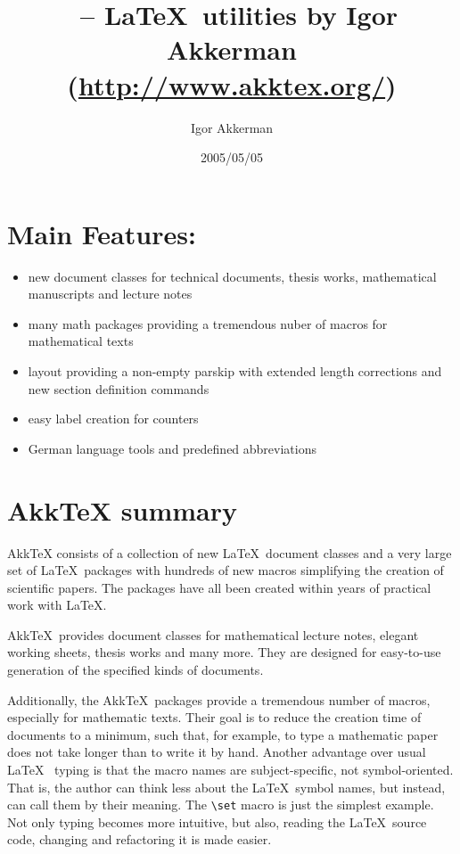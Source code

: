 \documentclass[DIV=9, pagesize=auto]{scrartcl}
\title{\AkkTeX\ -- \LaTeX\ utilities by Igor Akkerman (\url{http://www.akktex.org/})}
\author{Igor Akkerman}
\date{2005/05/05}
\makeatletter
\newcommand*{\AkkTeX}{Akk\kern-0.09em\TeX\@\xspace}
\def\AkkTeX{AkkTeX\xspace}%
\makeatother
\begin{document}
\maketitle

\section{Main Features:}

\begin{itemize}
\item new document classes for technical documents, thesis works, mathematical
  manuscripts and lecture notes
\item many math packages providing a tremendous nuber of macros for mathematical
  texts
\item layout providing a non-empty parskip with extended length corrections and
  new section definition commands
\item easy label creation for counters
\item German language tools and predefined abbreviations
\end{itemize}


\section{\AkkTeX summary}

\AkkTeX consists of a collection of new \LaTeX\ document classes and a very large
set of \LaTeX\ packages with hundreds of new macros simplifying the creation of
scientific papers. The packages have all been created within years of practical
work with \LaTeX.

\AkkTeX\ provides document classes for mathematical lecture notes, elegant
working sheets, thesis works and many more. They are designed for easy-to-use
generation of the specified kinds of documents.

Additionally, the \AkkTeX\ packages provide a tremendous number of macros,
especially for mathematic texts. Their goal is to reduce the creation time of
documents to a minimum, such that, for example, to type a mathematic paper does
not take longer than to write it by hand. Another advantage over usual \LaTeX\ %
typing is that the macro names are subject-specific, not symbol-oriented.
That is, the author can think less about the \LaTeX\ symbol names, but instead,
can call them by their meaning. The \verb+\set+ macro is just the simplest example.
Not only typing becomes more intuitive, but also, reading the \LaTeX\ source code,
changing and refactoring it is made easier.
\end{document}
